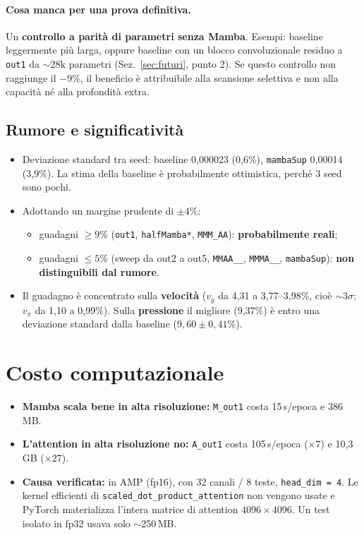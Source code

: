 \documentclass[11pt,a4paper]{article}
\newcommand{\cfg}[1]{\texttt{#1}}
\begin{document}
\paragraph{Cosa manca per una prova definitiva.} Un \textbf{controllo a parità di parametri senza Mamba}. Esempi: baseline leggermente più larga, oppure baseline con un blocco convoluzionale residuo a \cfg{out1} da $\sim$28k parametri (Sez.~\ref{sec:futuri}, punto 2). Se questo controllo non raggiunge il $-9\%$, il beneficio è attribuibile alla scansione selettiva e non alla capacità né alla profondità extra.

\subsection*{Rumore e significatività}
\begin{itemize}
  \item Deviazione standard tra seed: baseline 0,000023 (0,6\%), \cfg{mambaSup} 0,00014 (3,9\%). La stima della baseline è probabilmente ottimistica, perché 3 seed sono pochi.
  \item Adottando un margine prudente di $\pm4\%$:
  \begin{itemize}
    \item guadagni $\geq 9\%$ (\cfg{out1}, \cfg{halfMamba*}, \cfg{MMM\_AA}): \textbf{probabilmente reali};
    \item guadagni $\leq 5\%$ (sweep da out2 a out5, \cfg{MMAA\_\_}, \cfg{MMMA\_\_}, \cfg{mambaSup}): \textbf{non distinguibili dal rumore}.
  \end{itemize}
  \item Il guadagno è concentrato sulla \textbf{velocità} ($v_y$ da 4,31 a 3,77--3,98\%, cioè $\sim3\sigma$; $v_x$ da 1,10 a 0,99\%). Sulla \textbf{pressione} il migliore (9,37\%) è entro una deviazione standard dalla baseline ($9{,}60 \pm 0{,}41\%$).
\end{itemize}

\section{Costo computazionale}
\label{sec:costo}

\begin{itemize}
  \item \textbf{Mamba scala bene in alta risoluzione:} \cfg{M\_out1} costa 15\,s/epoca e 386\,MB.
  \item \textbf{L'attention in alta risoluzione no:} \cfg{A\_out1} costa 105\,s/epoca ($\times7$) e 10,3\,GB ($\times27$).
  \item \textbf{Causa verificata:} in AMP (fp16), con 32 canali / 8 teste, \cfg{head\_dim = 4}. Le kernel efficienti di \cfg{scaled\_dot\_product\_attention} non vengono usate e PyTorch materializza l'intera matrice di attention $4096\times4096$. Un test isolato in fp32 usava solo $\sim$250\,MB.
\end{itemize}
\end{document}
